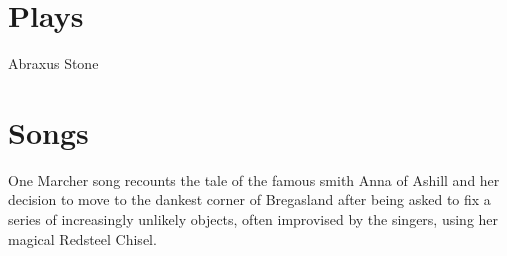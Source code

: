\chapter{Plays}
Abraxus Stone

\chapter{Songs}
One Marcher song recounts the tale of the famous smith Anna of Ashill and her decision to move to the dankest corner of Bregasland after being asked to fix a series of increasingly unlikely objects, often improvised by the singers, using her magical Redsteel Chisel. 


